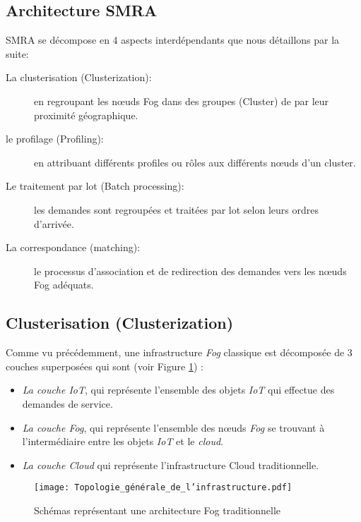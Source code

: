 \subsection{Architecture SMRA}



SMRA se décompose en 4 aspects interdépendants que nous détaillons par la suite:



\begin{description}
  \item[La clusterisation (Clusterization):] en regroupant les nœuds Fog dans des groupes (Cluster) de par leur proximité géographique.
  \item[le profilage (Profiling):] en attribuant différents profiles ou rôles aux différents nœuds d'un cluster.
  \item[Le traitement par lot (Batch processing):] les demandes sont regroupées et traitées par lot selon leurs ordres d'arrivée.
  \item[La correspondance (matching):] le processus d'association et de redirection des demandes vers les nœuds Fog adéquats.
\end{description}
\newpage
\subsection{Clusterisation (Clusterization)}



Comme vu précédemment, une infrastructure \emph{Fog} classique est décomposée de 3 couches superposées qui sont (voir Figure \ref{fig:Topologie_generale_de_linfrastructure}) :



\begin{itemize}
    \item \emph{La couche IoT}, qui représente l'ensemble des objets \emph{IoT} qui effectue des demandes de service.
    \item \emph{La couche Fog}, qui représente l'ensemble des nœuds \emph{Fog} se trouvant à l'intermédiaire entre les objets \emph{IoT} et le \emph{cloud}.
    \item \emph{La couche Cloud} qui représente l'infrastructure Cloud traditionnelle.
\end{itemize}



\begin{figure}[H]
    \centering
    \texttt{[image: Topologie\_générale\_de\_l'infrastructure.pdf]}
    \caption{Schémas représentant une architecture Fog traditionnelle}
    \label{fig:Topologie_generale_de_linfrastructure}
\end{figure}



